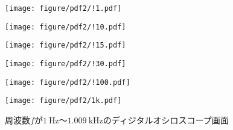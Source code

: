 \documentclass[10pt,a4paper]{jsarticle}
\numberwithin{equation}{section}
\numberwithin{figure}{section}
\numberwithin{table}{section}
\begin{document}
  \begin{figure}[H]
    \begin{minipage}[H]{0.5\linewidth}  
      \centering
      \texttt{[image: figure/pdf2/!1.pdf]}
    \end{minipage}
    \begin{minipage}[H]{0.5\linewidth}  
      \centering
      \texttt{[image: figure/pdf2/!10.pdf]}
    \end{minipage}
    \begin{minipage}[H]{0.5\linewidth}  
      \centering
      \texttt{[image: figure/pdf2/!15.pdf]}
    \end{minipage}
    \begin{minipage}[H]{0.5\linewidth}  
      \centering
      \texttt{[image: figure/pdf2/!30.pdf]}
    \end{minipage}
    \begin{minipage}[H]{0.5\linewidth}  
      \centering
      \texttt{[image: figure/pdf2/!100.pdf]}
    \end{minipage}
    \begin{minipage}[H]{0.5\linewidth}  
      \centering
      \texttt{[image: figure/pdf2/1k.pdf]}
    \end{minipage}
    \caption{周波数$f$が$\SI{1}{\hertz}$～$\SI{1.009}{\kilo\hertz}$のディジタルオシロスコープ画面}\label{fig:USB}
  \end{figure}
\end{document}
